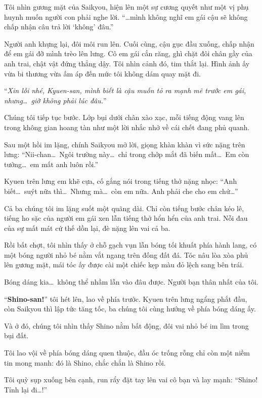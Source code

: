 \documentclass[../main.tex]{subfiles}
\begin{document}
Tôi nhìn gương mặt của Saikyou, hiện lên một sự cương quyết như một vị phụ huynh muốn người con phải nghe lời. ``\dots mình không nghĩ em gái cậu sẽ không chấp nhận câu trả lời `không' đâu.''

Người anh khựng lại, đôi môi run lên. Cuối cùng, cậu gục đầu xuống, chấp nhận để em gái đỡ mình trèo lên lưng. Cô em gái cắn răng, ghì chặt đôi chân gầy của anh trai, chật vật đứng thẳng dậy. Tôi nhìn cảnh đó, tim thắt lại. Hình ảnh ấy vừa bi thương vừa ấm áp đến mức tôi không dám quay mặt đi.

``\textit{Xin lỗi nhé, Kyuen-san, mình biết là cậu muốn tỏ ra mạnh mẽ trước em gái, nhưng\dots\ giờ không phải lúc đâu.}''

Chúng tôi tiếp tục bước. Lớp bụi dưới chân xào xạc, mỗi tiếng động vang lên trong không gian hoang tàn như một lời nhắc nhở về cái chết đang phủ quanh.

Sau một hồi im lặng, chính Saikyou mở lời, giọng khàn khàn vì sức nặng trên lưng: ``Nii-chan\dots\ Ngôi trường này\dots\ chỉ trong chớp mắt đã biến mất\dots\ Em còn tưởng\dots\ em mất anh luôn rồi.''

Kyuen trên lưng em khẽ cựa, cố gắng nói trong tiếng thở nặng nhọc: ``Anh biết\dots\ suýt nữa thì\dots\ Nhưng mà\dots\ còn em nữa. Anh phải che cho em chứ\dots''

Cả ba chúng tôi im lặng suốt một quãng dài. Chỉ còn tiếng bước chân kéo lê, tiếng ho sặc của người em gái xen lẫn tiếng thở hổn hển của anh trai. Nỗi đau của sự mất mát cứ thế dồn lại, đè nặng lên vai cả ba.

Rồi bất chợt, tôi nhìn thấy ở chỗ gạch vụn lẫn bóng tối khuất phía hành lang, có một bóng người nhỏ bé nằm vắt ngang trên đống đất đá. Tóc nâu lòa xòa phủ lên gương mặt, mái tóc ấy được cài một chiếc kẹp màu đỏ lệch sang bên trái.

Bóng dáng kia\dots\ không thể nhầm lẫn vào đâu được. Người bạn thân nhất của tôi.

``\textbf{Shino-san!}'' tôi hét lên, lao về phía trước. Kyuen trên lưng ngẩng phắt đầu, còn Saikyou thì lập tức tăng tốc, ba chúng tôi cùng hướng về phía bóng dáng ấy.

Và ở đó, chúng tôi nhìn thấy Shino nằm bất động, đôi vai nhỏ bé im lìm trong bụi đất.


Tôi lao vội về phía bóng dáng quen thuộc, đầu óc trống rỗng chỉ còn một niềm tin mong manh: đó là Shino, chắc chắn là Shino rồi.

Tôi quỳ sụp xuống bên cạnh, run rẩy đặt tay lên vai cô bạn và lay mạnh: ``Shino! Tỉnh lại đi\dots!''
\end{document}

